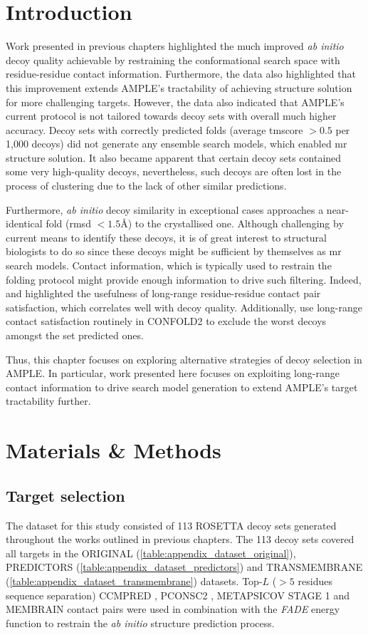 \section{Introduction}
Work presented in previous chapters highlighted the much improved \textit{ab initio} decoy quality achievable by restraining the conformational search space with residue-residue contact information. Furthermore, the data also highlighted that this improvement extends AMPLE's tractability of achieving structure solution for more challenging targets. However, the data also indicated that AMPLE's current protocol is not tailored towards decoy sets with overall much higher accuracy. Decoy sets with correctly predicted folds (average \gls{tmscore} $>0.5$ per 1,000 decoys) did not generate any ensemble search models, which enabled \gls{mr} structure solution. It also became apparent that certain decoy sets contained some very high-quality decoys, nevertheless, such decoys are often lost in the process of clustering due to the lack of other similar predictions.

Furthermore, \textit{ab initio} decoy similarity in exceptional cases approaches a near-identical fold (\gls{rmsd} $<1.5$\AA) to the crystallised one. Although challenging by current means to identify these decoys, it is of great interest to structural biologists to do so since these decoys might be sufficient by themselves as \gls{mr} search models. Contact information, which is typically used to restrain the folding protocol might provide enough information to drive such filtering. Indeed, \textcite{Kosciolek2014-bt} and \textcite{De_Oliveira2017-gj} highlighted the usefulness of long-range residue-residue contact pair satisfaction, which correlates well with decoy quality. Additionally, \textcite{Adhikari2018-lj} use long-range contact satisfaction routinely in CONFOLD2 to exclude the worst decoys amongst the set predicted ones.

Thus, this chapter focuses on exploring alternative strategies of decoy selection in AMPLE. In particular, work presented here focuses on exploiting long-range contact information to drive search model generation to extend AMPLE's target tractability further.

\section{Materials \& Methods}
\subsection{Target selection}
The dataset for this study consisted of 113 ROSETTA decoy sets generated throughout the works outlined in previous chapters. The 113 decoy sets covered all targets in the ORIGINAL (\cref{table:appendix_dataset_original}), PREDICTORS (\cref{table:appendix_dataset_predictors}) and TRANSMEMBRANE (\cref{table:appendix_dataset_transmembrane}) datasets. Top-$L$ ($>5$ residues sequence separation) CCMPRED \cite{Seemayer2014-zp}, PCONSC2 \cite{Skwark2014-qp}, METAPSICOV STAGE 1 \cite{Jones2015-vq} and MEMBRAIN \cite{Yang2013-bf} contact pairs were used in combination with the \textit{FADE} energy function to restrain the \textit{ab initio} structure prediction process.

